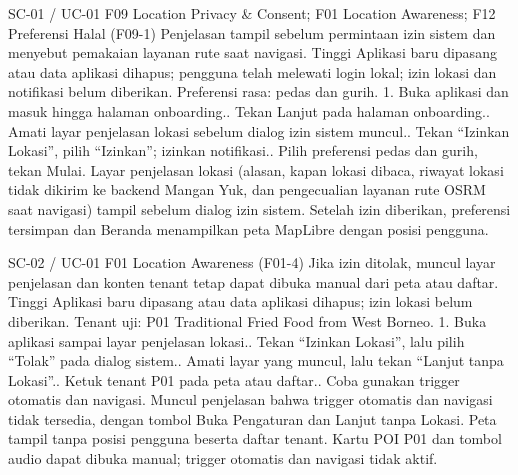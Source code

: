 \renewcommand{\tcactual}{Sesuai ekspektasi pada perangkat Android (Alur privasi lolos (\texttt{08-privacy}, \texttt{10-onboarding})). Layar penjelasan lokasi (alasan, kapan lokasi dibaca, riwayat lokasi tidak dikirim ke backend Mangan Yuk, dan pengecualian layanan rute OSRM saat navigasi) tampil sebelum dialog izin sistem. Setelah izin diberikan, preferensi tersimpan dan Beranda menampilkan peta MapLibre dengan posisi pengguna.}
{SC-01 / UC-01}
{F09 Location Privacy \& Consent; F01 Location Awareness; F12 Preferensi Halal}
{(F09-1) Penjelasan tampil sebelum permintaan izin sistem dan menyebut pemakaian layanan rute saat navigasi.}
{Tinggi}
{Aplikasi baru dipasang atau data aplikasi dihapus; pengguna telah melewati login lokal; izin lokasi dan notifikasi belum diberikan.}
{Preferensi rasa: pedas dan gurih.}
{1. Buka aplikasi dan masuk hingga halaman onboarding.. Tekan Lanjut pada halaman onboarding.. Amati layar penjelasan lokasi sebelum dialog izin sistem muncul.. Tekan ``Izinkan Lokasi'', pilih ``Izinkan''; izinkan notifikasi.. Pilih preferensi pedas dan gurih, tekan Mulai.}
{Layar penjelasan lokasi (alasan, kapan lokasi dibaca, riwayat lokasi tidak dikirim ke backend Mangan Yuk, dan pengecualian layanan rute OSRM saat navigasi) tampil sebelum dialog izin sistem. Setelah izin diberikan, preferensi tersimpan dan Beranda menampilkan peta MapLibre dengan posisi pengguna.}

\renewcommand{\tcactual}{Sesuai ekspektasi pada perangkat Android (Logika izin (\texttt{10-onboarding}) lolos). Muncul penjelasan bahwa trigger otomatis dan navigasi tidak tersedia, dengan tombol Buka Pengaturan dan Lanjut tanpa Lokasi. Peta tampil tanpa posisi pengguna beserta daftar tenant. Kartu POI P01 dan tombol audio dapat dibuka manual; trigger otomatis dan navigasi tidak aktif.}
{SC-02 / UC-01}
{F01 Location Awareness}
{(F01-4) Jika izin ditolak, muncul layar penjelasan dan konten tenant tetap dapat dibuka manual dari peta atau daftar.}
{Tinggi}
{Aplikasi baru dipasang atau data aplikasi dihapus; izin lokasi belum diberikan.}
{Tenant uji: P01 Traditional Fried Food from West Borneo.}
{1. Buka aplikasi sampai layar penjelasan lokasi.. Tekan ``Izinkan Lokasi'', lalu pilih ``Tolak'' pada dialog sistem.. Amati layar yang muncul, lalu tekan ``Lanjut tanpa Lokasi''.. Ketuk tenant P01 pada peta atau daftar.. Coba gunakan trigger otomatis dan navigasi.}
{Muncul penjelasan bahwa trigger otomatis dan navigasi tidak tersedia, dengan tombol Buka Pengaturan dan Lanjut tanpa Lokasi. Peta tampil tanpa posisi pengguna beserta daftar tenant. Kartu POI P01 dan tombol audio dapat dibuka manual; trigger otomatis dan navigasi tidak aktif.}

